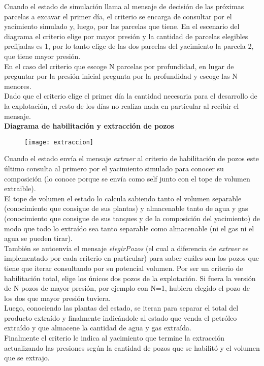 Cuando el estado de simulación llama al mensaje de decisión de las próximas parcelas a excavar el primer día, el criterio se encarga de consultar por el yacimiento simulado y, luego, por las parcelas que tiene. En el escenario del diagrama el criterio elige por mayor presión y la cantidad de parcelas elegibles prefijadas es 1, por lo tanto elige de las dos parcelas del yacimiento la parcela 2, que tiene mayor presión.
\\

En el caso del criterio que escoge N parcelas por profundidad, en lugar de preguntar por la presión inicial pregunta por la profundidad y escoge las N menores.
\\

Dado que el criterio elige el primer día la cantidad necesaria para el desarrollo de la explotación, el resto de los días no realiza nada en particular al recibir el mensaje.
\\


\newpage
\textbf{Diagrama de habilitación y extracción de pozos}
\begin{figure}[H]
\texttt{[image: extraccion]}
\end{figure}

Cuando el estado envía el mensaje \emph{extraer} al criterio de habilitación de pozos este último consulta al primero por el yacimiento simulado para conocer su composición (lo conoce porque se envía como self junto con el tope de volumen extraible).
\\

El tope de volumen el estado lo calcula sabiendo tanto el volumen separable (conocimiento que consigue de sus plantas) y almacenable tanto de agua y gas (conocimiento que consigue de sus tanques y de la composición del yacimiento) de modo que todo lo extraído sea tanto separable como almacenable (ni el gas ni el agua se pueden tirar).
\\

También se autoenvía el mensaje \emph{elegirPozos} (el cual a diferencia de \emph{extraer} es implementado por cada criterio en particular) para saber cuáles son los pozos que tiene que iterar consultando por su potencial volumen. Por ser un criterio de habilitación total, elige los únicos dos pozos de la explotación. Si fuera la versión de N pozos de mayor presión, por ejemplo con N=1, hubiera elegido el pozo de los dos que mayor presión tuviera.
\\

Luego, conociendo las plantas del estado, se iteran para separar el total del producto extraído y finalmente indicándole al estado que venda el petróleo extraído y que almacene la cantidad de agua y gas extraída.
\\

Finalmente el criterio le indica al yacimiento que termine la extracción actualizando las presiones según la cantidad de pozos que se habilitó y el volumen que se extrajo.

